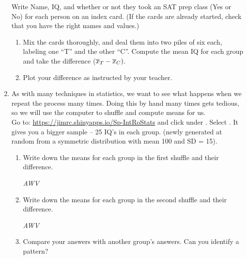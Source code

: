 \begin{enumerate}
Write Name, IQ, and whether or not they took an SAT prep class (Yes or
No) for each person on an index card.
(If the cards are already started, check that you have the right
names and values.)  
   \begin{enumerate}
   \item Mix the cards thoroughly, and deal them into two piles of six
     each, labeling one ``T'' and the other ``C''.
     Compute the mean IQ for each group and take the difference
     ($\overline{x}_T - \overline{x}_C)$.\vspace{1cm}
   \item Plot your difference as instructed by your teacher. \vspace{1cm} 
\end{enumerate}

\item As with many techniques in statistics, we want to see what
  happens when we repeat the process many times.  Doing this by hand
  many times gets tedious, so we will use the computer to shuffle and
  compute means for us. \\ Go to:
  \url{https://jimrc.shinyapps.io/Sp-IntRoStats} and click
    under .
   Select . It gives you a bigger sample -- 25 IQ's in each
   group. (newly generated at random from a symmetric distribution
   with mean 100 and SD = 15).
   \begin{enumerate}
   \item Write down the means for each group in the first shuffle and
     their difference.
\begin{students}
 \vspace{1cm}
\end{students}

\begin{key}
 {\it AWV}
\end{key}

   \item Write down the means for each group in the second shuffle and
     their difference.
\begin{students}
 \vspace{1cm}
\end{students}

\begin{key}
 {\it AWV}
\end{key}
\item Compare your answers with another group's answers.  Can you
  identify a pattern?
\begin{students}
 \vspace{1cm}
\end{students}


\end{enumerate}
\end{enumerate}
